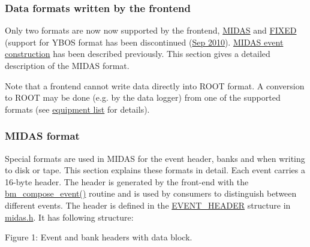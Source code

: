 \subsubsection{Data formats written by the frontend}\label{FE_Data_format}
\par




\par
 \par
 \label{FE_Data_format_idx_format_frontend}
\hypertarget{FE_Data_format_idx_format_frontend}{}
 Only two formats are now now supported by the frontend, \hyperlink{FE_Data_format_FE_Midas_format}{MIDAS} and \hyperlink{FE_bank_construction_FE_FIXED_event_readout}{FIXED} (support for YBOS format has been discontinued (\hyperlink{NDF_ndf_sep_2010}{Sep 2010}). \hyperlink{FE_bank_construction_FE_MIDAS_event_construction}{MIDAS event construction} has been described previously. This section gives a detailed description of the MIDAS format.

Note that a frontend cannot write data directly into ROOT format. A conversion to ROOT may be done (e.g. by the data logger) from one of the supported formats (see \hyperlink{FE_table_FE_tbl_Format}{equipment list} for details).

\label{FE_Data_format_idx_format_MIDAS}
\hypertarget{FE_Data_format_idx_format_MIDAS}{}
 \label{FE_Data_format_idx_Midas_format}
\hypertarget{FE_Data_format_idx_Midas_format}{}
 \label{FE_Data_format_Midas_format}
\hypertarget{FE_Data_format_Midas_format}{}
 

 \hypertarget{FE_Data_format_FE_Midas_format}{}\subsubsection{MIDAS format}\label{FE_Data_format_FE_Midas_format}
Special formats are used in MIDAS for the event header, banks and when writing to disk or tape. This section explains these formats in detail. Each event carries a 16-\/byte header. The header is generated by the front-\/end with the \hyperlink{group__bmfunctionc_gac5e3e469fb6721a502ebd80a35a328f5}{bm\_\-compose\_\-event()} routine and is used by consumers to distinguish between different events. The header is defined in the \hyperlink{structEVENT__HEADER}{EVENT\_\-HEADER} structure in \hyperlink{midas_8h}{midas.h}. It has following structure:

\begin{center} Figure 1: Event and bank headers with data block.  \end{center} 



